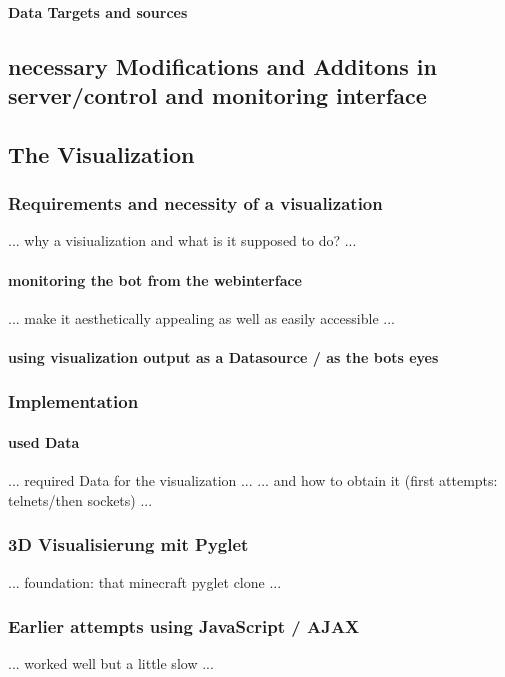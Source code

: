 \paragraph{Data Targets and sources}

\subsection{necessary Modifications and Additons in server/control and monitoring interface}

\subsection{The Visualization}

\subsubsection{Requirements and necessity of a visualization}
... why a visiualization and what is it supposed to do? ...

\paragraph{monitoring the bot from the webinterface}
... make it aesthetically appealing as well as easily accessible ...

\paragraph{using visualization output as a Datasource / as the bots eyes}

\subsubsection{Implementation}

\paragraph{used Data}
... required Data for the visualization ...
... and how to obtain it (first attempts: telnets/then sockets) ...

\subsubsection{3D Visualisierung mit Pyglet}
... foundation: that minecraft pyglet clone ...

\subsubsection{Earlier attempts using JavaScript / AJAX}
... worked well but a little slow ...

